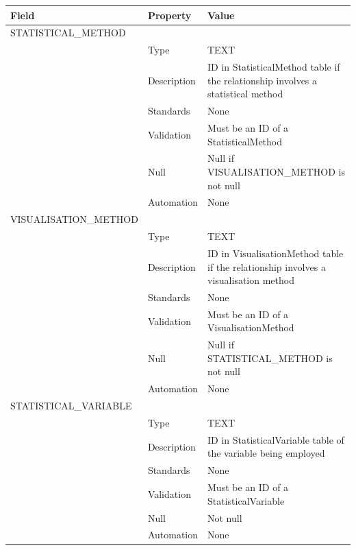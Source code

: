 \begin{longtable}[]{@{}
  >{\raggedright\arraybackslash}p{}
  >{\raggedright\arraybackslash}p{}
  >{\raggedright\arraybackslash}p{}@{}}
\toprule\noalign{}
\begin{minipage}[b]{\linewidth}\raggedright
Field
\end{minipage} & \begin{minipage}[b]{\linewidth}\raggedright
Property
\end{minipage} & \begin{minipage}[b]{\linewidth}\raggedright
Value
\end{minipage} \\
\midrule\noalign{}
\endhead
\bottomrule\noalign{}
\endlastfoot
STATISTICAL\_METHOD & & \\
& Type & TEXT \\
& Description & ID in StatisticalMethod table if the relationship
involves a statistical method \\
& Standards & None \\
& Validation & Must be an ID of a StatisticalMethod \\
& Null & Null if VISUALISATION\_METHOD is not null \\
& Automation & None \\
VISUALISATION\_METHOD & & \\
& Type & TEXT \\
& Description & ID in VisualisationMethod table if the relationship
involves a visualisation method \\
& Standards & None \\
& Validation & Must be an ID of a VisualisationMethod \\
& Null & Null if STATISTICAL\_METHOD is not null \\
& Automation & None \\
STATISTICAL\_VARIABLE & & \\
& Type & TEXT \\
& Description & ID in StatisticalVariable table of the variable being
employed \\
& Standards & None \\
& Validation & Must be an ID of a StatisticalVariable \\
& Null & Not null \\
& Automation & None \\
\end{longtable}

